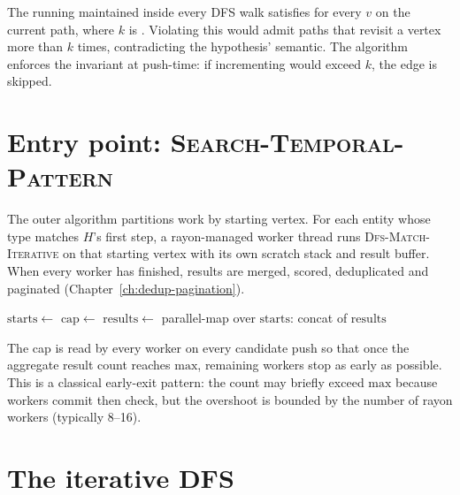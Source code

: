 \begin{invariant}[$k$-simplicity]
The running  maintained
inside every DFS walk satisfies  for
every $v$ on the current path, where $k$ is
. Violating this would admit paths
that revisit a vertex more than $k$ times, contradicting the
hypothesis' semantic. The algorithm enforces the invariant at
push-time: if incrementing  would exceed
$k$, the edge is skipped.
\end{invariant}

\section{Entry point: \textsc{Search-Temporal-Pattern}}

The outer algorithm partitions work by starting vertex. For each
entity whose type matches $H$'s first step, a rayon-managed worker
thread runs \textsc{Dfs-Match-Iterative} on that starting vertex
with its own scratch stack and result buffer. When every worker has
finished, results are merged, scored, deduplicated and paginated
(Chapter~\ref{ch:dedup-pagination}).

\begin{algorithm}
\caption{\textsc{Search-Temporal-Pattern}}\label{alg:search-entry}
$\mathrm{starts} \gets $ \;
$\mathrm{cap} \gets $ \;
$\mathrm{results} \gets $ parallel-map over $\mathrm{starts}$:
\Return concat of $\mathrm{results}$\;
\end{algorithm}

The  cap is read by every worker on every
candidate push so that once the aggregate result count reaches
$\mathrm{max}$, remaining workers stop as early as possible. This
is a classical early-exit pattern: the count may briefly exceed
$\mathrm{max}$ because workers commit then check, but the overshoot
is bounded by the number of rayon workers (typically 8--16).

\section{The iterative DFS}

